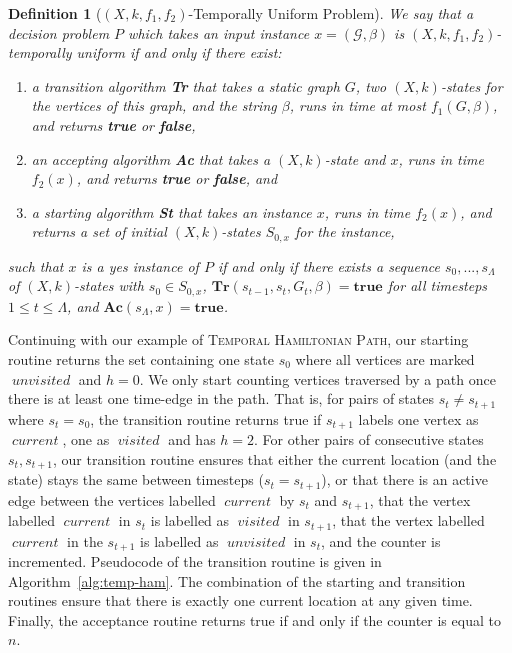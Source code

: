 \documentclass[a4paper,UKenglish,cleveref, autoref, thm-restate]{lipics-v2021} %
\DeclareMathOperator{\visited}{\textit{visited}}
\DeclareMathOperator{\unvisited}{\textit{unvisited}}
\DeclareMathOperator{\current}{\textit{current}}
\newcounter{ctheorem}
\newtheorem{defn}[ctheorem]{Definition}
\begin{document}
\begin{defn}[$(X,k,f_1,f_2)$-Temporally Uniform Problem]
    We say that a decision problem $P$ which takes an input instance $x=(\mathcal{G},\beta)$ is $(X,k,f_1,f_2)$-temporally uniform if and only if there exist:
    \begin{enumerate}
        \item a transition algorithm \textbf{Tr} that takes a static graph $G$, two $(X,k)$-states for the vertices of this graph, and the string $\beta$, runs in time at most $f_1(G,\beta)$, and returns \textbf{true} or \textbf{false},
        \item an accepting algorithm \textbf{Ac} that takes a $(X,k)$-state and $x$, runs in time $f_2(x)$, and returns \textbf{true} or \textbf{false}, and
        \item a starting algorithm \textbf{St} that takes an instance $x$, runs in time $f_2(x)$, and returns a set of initial $(X,k)$-states $S_{0,x}$ for the instance,
    \end{enumerate}

    \noindent such that $x$ is a yes instance of $P$ if and only if there exists a sequence $s_0, ..., s_\Lambda$ of $(X,k)$-states with $s_0 \in S_{0,x}$, $\textbf{Tr}(s_{t-1}, s_t, G_t,\beta)=\textbf{true}$ for all timesteps $1 \leq t \leq \Lambda$, and $\textbf{Ac}(s_\Lambda, x)=\textbf{true}$.
\end{defn}

Continuing with our example of \textsc{Temporal Hamiltonian Path}, our starting routine returns the set containing one state $s_0$ where all vertices are marked $\unvisited$ and $h=0$. We only start counting vertices traversed by a path once there is at least one time-edge in the path. That is, for pairs of states $s_t\neq s_{t+1}$ where $s_t=s_0$, the transition routine returns true if $s_{t+1}$ labels one vertex as $\current$, one as $\visited$ and has $h=2$. For other pairs of consecutive states $s_t,s_{t+1}$, our transition routine ensures that either the current location (and the state) stays the same between timesteps ($s_t=s_{t+1}$), or that there is an active edge between the vertices labelled $\current$ by $s_t$ and $s_{t+1}$, that the vertex labelled $\current$ in $s_t$ is labelled as $\visited$ in $s_{t+1}$, that the vertex labelled $\current$ in the $s_{t+1}$ is labelled as $\unvisited$ in $s_t$, and the counter is incremented. Pseudocode of the transition routine is given in Algorithm~\ref{alg:temp-ham}. The combination of the starting and transition routines ensure that there is exactly one current location at any given time. Finally, the acceptance routine returns true if and only if the counter is equal to $n$.
\end{document}
